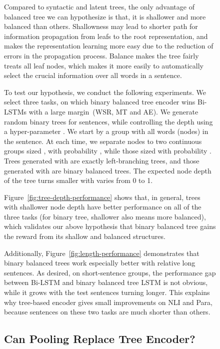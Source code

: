 \documentclass[11pt,a4paper]{article}
\begin{document}
\begin{figure}[t!]
Compared to syntactic and latent trees, the only advantage of balanced tree we can hypothesize is that, it is shallower and more balanced than others.
Shallowness may lead to shorter path for information propagation from leafs to the root representation, and makes the representation learning more easy due to the reduction of errors in the propagation process.
Balance makes the tree fairly treats all leaf nodes, which makes it more easily to automatically select the crucial information over all words in a sentence.  

To test our hypothesis, we conduct the following experiments. 
We select three tasks, on which binary balanced tree encoder wins Bi-LSTMs with a large margin~(WSR, MT and AE).
We generate random binary trees for sentences, while controlling the depth using a hyper-parameter . 
We start by a group with all words (nodes) in the sentence.
At each time, we separate  nodes to two continuous groups sized ,  with probability , while those sized  with probability .
Trees generated with  are exactly left-branching trees, and those generated with  are binary balanced trees. 
The expected node depth of the tree turns smaller with  varies from 0 to 1.

Figure~\ref{fig:tree-depth-performance} shows that, in general, trees with shallower node depth have better performance on all of the three tasks (for binary tree, shallower also means more balanced), which validates our above hypothesis that binary balanced tree gains the reward from its shallow and balanced structures. 

Additionally, Figure~\ref{fig:length-performance} demonstrates that binary balanced trees work especially better with relative long sentences. 
As desired, on short-sentence groups, the performance gap between Bi-LSTM and binary balanced tree LSTM is not obvious, while it grows with the test sentences turning longer. 
This explains why tree-based encoder gives small improvements on NLI and Para, because sentences on these two tasks are much shorter than others.




\subsection{Can Pooling Replace Tree Encoder?}
\label{sec:pooling}
\begin{figure}[t]
\centering
{}


\end{figure}
\end{figure}
\end{document}
